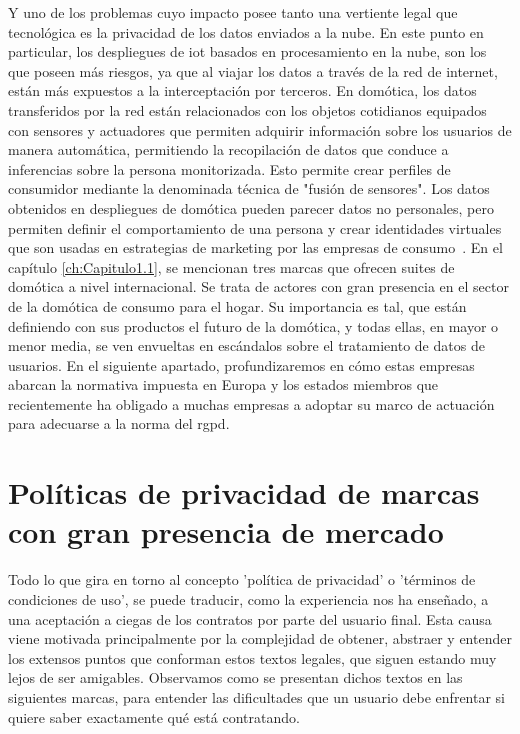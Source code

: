\vspace{1cm}

Y uno de los problemas cuyo impacto posee tanto una vertiente legal que tecnológica es la privacidad de los datos enviados a la nube. En este punto en particular, los despliegues de \gls{iot} basados en procesamiento en la nube, son los que poseen más riesgos, ya que al viajar los datos a través de la red de internet, están más expuestos a la interceptación por terceros. En domótica, los datos transferidos por la red están relacionados con los objetos cotidianos equipados con sensores y actuadores que permiten adquirir información sobre los usuarios de manera automática, permitiendo la recopilación de datos que conduce a inferencias sobre la persona monitorizada. Esto permite crear perfiles de consumidor mediante la denominada técnica de "fusión de sensores". Los datos obtenidos en despliegues de domótica pueden parecer datos no personales, pero permiten definir el comportamiento de una persona y crear identidades virtuales que son usadas en estrategias de marketing por las empresas de consumo~\cite{iotDataProtection}. En el capítulo \ref{ch:Capitulo1.1}, se mencionan tres marcas que ofrecen suites de domótica a nivel internacional. Se trata de actores con gran presencia en el sector de la domótica de consumo para el hogar. Su importancia es tal, que están definiendo con sus productos el futuro de la domótica, y todas ellas, en mayor o menor media, se ven envueltas en escándalos sobre el tratamiento de datos de usuarios. En el siguiente apartado, profundizaremos en cómo estas empresas abarcan la normativa impuesta en Europa y los estados miembros que recientemente ha obligado a muchas empresas a adoptar su marco de actuación para adecuarse a la norma del \gls{rgpd}.

\section{Políticas de privacidad de marcas con gran presencia de mercado}
\label{ch:Capitulo2.1}

Todo lo que gira en torno al concepto 'política de privacidad' o 'términos de condiciones de uso', se puede traducir, como la experiencia nos ha enseñado, a una aceptación a ciegas de los contratos por parte del usuario final. Esta causa viene motivada principalmente por la complejidad de obtener, abstraer y entender los extensos puntos que conforman estos textos legales, que siguen estando muy lejos de ser amigables. Observamos como se presentan dichos textos en las siguientes marcas, para entender las dificultades que un usuario debe enfrentar si quiere saber exactamente qué está contratando.

